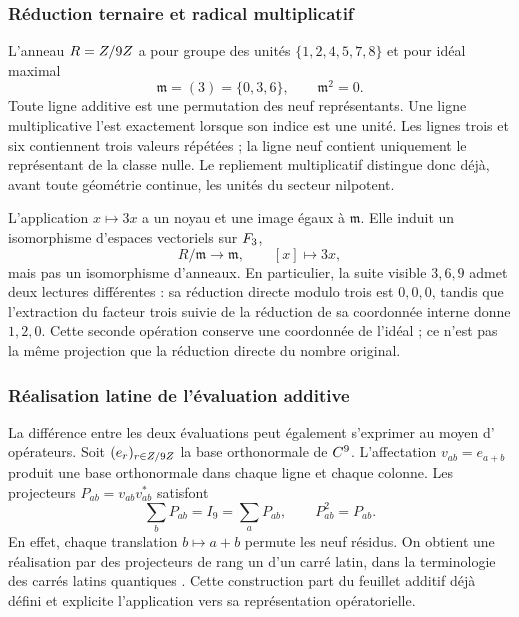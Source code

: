 

\subsubsection{Réduction ternaire et radical multiplicatif}

L'anneau \(R=Z/9Z\) a pour groupe des unités \(\{1,2,4,5,7,8\}\) et pour idéal maximal
\[
 \mathfrak m=(3)=\{0,3,6\},\qquad\mathfrak m^2=0.
\]
Toute ligne additive est une permutation des neuf représentants. Une ligne multiplicative l'est exactement lorsque son indice est une unité. Les lignes trois et six contiennent trois valeurs répétées ; la ligne neuf contient uniquement le représentant de la classe nulle. Le repliement multiplicatif distingue donc déjà, avant toute géométrie continue, les unités du secteur nilpotent.

L'application \(x\mapsto3x\) a un noyau et une image égaux à \(\mathfrak m\). Elle induit un isomorphisme d'espaces vectoriels sur \(F_3\),
\[
 R/\mathfrak m\longrightarrow\mathfrak m,\qquad [x]\longmapsto3x,
\]
mais pas un isomorphisme d'anneaux. En particulier, la suite visible \(3,6,9\) admet deux lectures différentes : sa réduction directe modulo trois est \(0,0,0\), tandis que l'extraction du facteur trois suivie de la réduction de sa coordonnée interne donne \(1,2,0\). Cette seconde opération conserve une coordonnée de l'idéal ; ce n'est pas la même projection que la réduction directe du nombre original.

\subsubsection{Réalisation latine de l'évaluation additive}

La différence entre les deux évaluations peut également s'exprimer au moyen d'
opérateurs. Soit \((e_r)_{r\in Z/9Z}\) la base orthonormale de \(C^9\).
L'affectation \(v_{ab}=e_{a+b}\) produit une base orthonormale dans chaque ligne
et chaque colonne. Les projecteurs \(P_{ab}=v_{ab}v_{ab}^{*}\) satisfont
\[
 \sum_bP_{ab}=I_9=\sum_aP_{ab},\qquad P_{ab}^2=P_{ab}.
\]
En effet, chaque translation \(b\mapsto a+b\) permute les neuf résidus. On obtient une réalisation par des projecteurs de rang un d'un carré latin, dans la terminologie des carrés latins quantiques \cite{mustovicary,delascuevas2023}. Cette construction part du feuillet additif déjà défini et explicite l'application vers sa représentation opératorielle.

